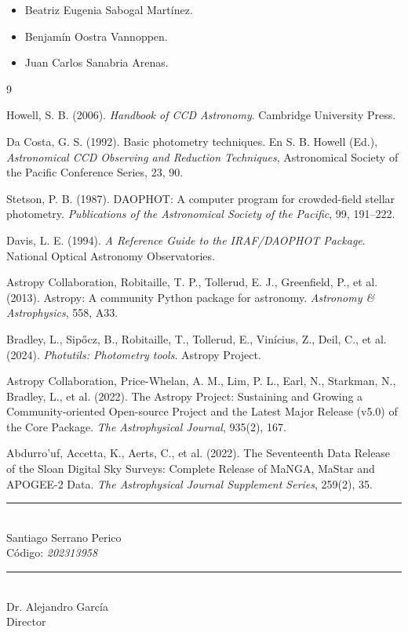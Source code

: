\documentclass[9pt]{extarticle}
\begin{document}
\begin{itemize}
    \item Beatriz Eugenia Sabogal Martínez.

    \item Benjamín Oostra Vannoppen.

    \item Juan Carlos Sanabria Arenas.
\end{itemize}

\begin{thebibliography}{9}

Howell, S. B. (2006). \textit{Handbook of CCD Astronomy}. Cambridge University Press.

Da Costa, G. S. (1992). Basic photometry techniques. En S. B. Howell (Ed.), \textit{Astronomical CCD Observing and Reduction Techniques}, Astronomical Society of the Pacific Conference Series, 23, 90.

Stetson, P. B. (1987). DAOPHOT: A computer program for crowded-field stellar photometry. \textit{Publications of the Astronomical Society of the Pacific}, 99, 191--222.

Davis, L. E. (1994). \textit{A Reference Guide to the IRAF/DAOPHOT Package}. National Optical Astronomy Observatories.

Astropy Collaboration, Robitaille, T. P., Tollerud, E. J., Greenfield, P., et al. (2013). Astropy: A community Python package for astronomy. \textit{Astronomy \& Astrophysics}, 558, A33.

Bradley, L., Sipőcz, B., Robitaille, T., Tollerud, E., Vinícius, Z., Deil, C., et al. (2024). \textit{Photutils: Photometry tools}. Astropy Project.

Astropy Collaboration, Price-Whelan, A. M., Lim, P. L., Earl, N., Starkman, N., Bradley, L., et al. (2022). The Astropy Project: Sustaining and Growing a Community-oriented Open-source Project and the Latest Major Release (v5.0) of the Core Package. \textit{The Astrophysical Journal}, 935(2), 167.

Abdurro'uf, Accetta, K., Aerts, C., et al. (2022). The Seventeenth Data Release of the Sloan Digital Sky Surveys: Complete Release of MaNGA, MaStar and APOGEE-2 Data. \textit{The Astrophysical Journal Supplement Series}, 259(2), 35.

\end{thebibliography}

\vspace{1.5cm}

\noindent
\begin{minipage}{0.45\textwidth}
\centering
\rule{7cm}{0.4pt}\\
Santiago Serrano Perico\\
Código: \textit{202313958}
\end{minipage}
\hfill
\begin{minipage}{0.45\textwidth}
\centering
\rule{7cm}{0.4pt}\\
Dr. Alejandro García\\
Director
\end{minipage}
\end{document}
